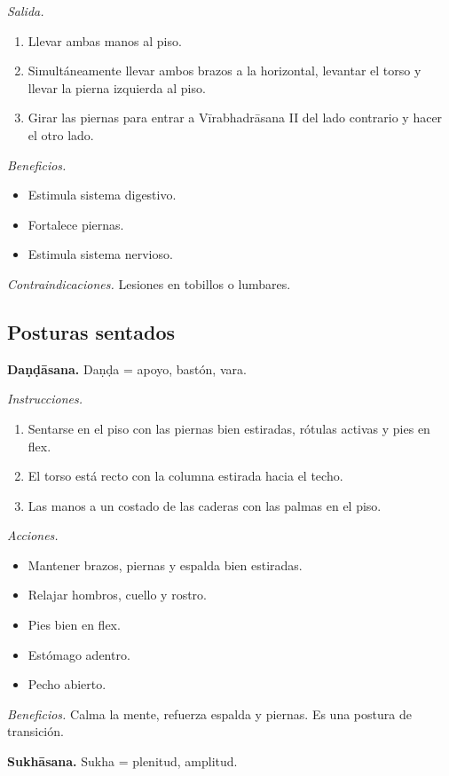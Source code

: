 \emph{Salida.}
\begin{enumerate}
\item Llevar ambas manos al piso.
\item Simultáneamente llevar ambos brazos a
la horizontal, levantar el torso y llevar la
pierna izquierda al piso.
\item Girar las piernas para entrar a
Vīrabhadrāsana II del lado contrario y hacer
el otro lado.
\end{enumerate}

\emph{Beneficios.}
\begin{itemize}
\item Estimula sistema digestivo.
\item Fortalece piernas.
\item Estimula sistema nervioso.
\end{itemize}

\emph{Contraindicaciones.} Lesiones en
tobillos o lumbares.

\subsection{Posturas sentados}
\label{section-posturas-sentados}

\medskip\noindent\textbf{Daṇḍāsana.}
Daṇḍa = apoyo, bastón, vara.

\emph{Instrucciones.}
\begin{enumerate}
\item Sentarse en el piso con las piernas
bien estiradas, rótulas activas y pies en
flex.
\item El torso está recto con la columna
estirada hacia el techo.
\item Las manos a un costado de las caderas
con las palmas en el piso.
\end{enumerate}

\emph{Acciones.}
\begin{itemize}
\item Mantener brazos, piernas y espalda bien
estiradas.
\item Relajar hombros, cuello y rostro.
\item Pies bien en flex.
\item Estómago adentro.
\item Pecho abierto.
\end{itemize}

\emph{Beneficios.} Calma la mente, refuerza
espalda y piernas. Es una postura de
transición.

\medskip\noindent\textbf{Sukhāsana.}
Sukha = plenitud, amplitud.

